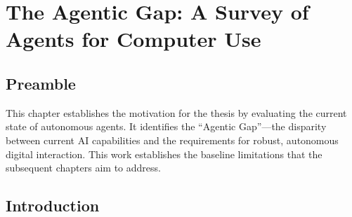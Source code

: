 \chapter{The Agentic Gap: A Survey of Agents for Computer Use}
\label{ch:acu-survey}

\section*{Preamble}
This chapter establishes the motivation for the thesis by evaluating the current state of autonomous agents. It identifies the ``Agentic Gap''---the disparity between current AI capabilities and the requirements for robust, autonomous digital interaction. This work establishes the baseline limitations that the subsequent chapters aim to address.

\section{Introduction}
\blindtext
